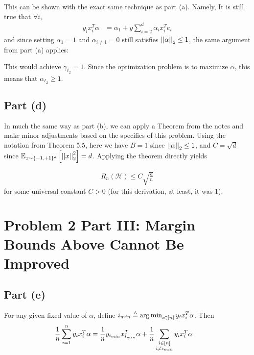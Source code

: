 \documentclass[11pt]{article}
\newcommand{\1}{\mathbb{I}} %
\begin{document}
This can be shown with the exact same technique as part (a). Namely, It is still true that $\forall i$,
\begin{align}
	y_i x_i^T \alpha 
		&= \alpha_1 + y \sum_{i=2}^{d} \alpha_i x_i^T e_i
\end{align}
and since setting $\alpha_1 = 1$ and $\alpha_{i \neq 1} = 0$ still satisfies $\norm{\alpha} \leq 1$, the same argument from part (a) applies:

\begin{myquote}[1em]
	This would achieve $\gamma_{\ell_2} = 1$. Since the optimization problem is to maximize $\alpha$, this means that $\alpha_{\ell_2} \geq 1$. 
\end{myquote}



\myspace 
\subsection*{Part (d)}

In much the same way as part (b), we can apply a Theorem from the notes and make minor adjustments based on the specifics of this problem. Using the notation from Theorem 5.5, here we have $B = 1$ since $\norm{\alpha} \leq 1$, and $C = \sqrt{d}$ since $\E[x \sim \{-1, +1\}^{d}]{\norm{x}^2} = d$. Applying the theorem directly yields

\begin{align}
	R_n(\mathcal H) \leq C \sqrt{\frac{d}{n}}
\end{align}
for some universal constant $C > 0$ (for this derivation, at least, it was $1$). 



\clearpage
\section*{Problem 2 Part III: Margin Bounds Above Cannot Be Improved}


\myspace 
\subsection*{Part (e)}

For any given fixed value of $\alpha$, define $i_{min} \triangleq \argmin_{i \in [n]} y_i x_i^T \alpha$. Then
\begin{align}
	\inv n \insum y_i x_i^T \alpha 
		&= \inv{n} y_{i_{min}} x_{i_{min}}^T \alpha + \inv{n} \sum_{\substack{i \in [n] \\ i \neq i_{min}}} y_i x_i^T \alpha
\end{align}
\end{document}
